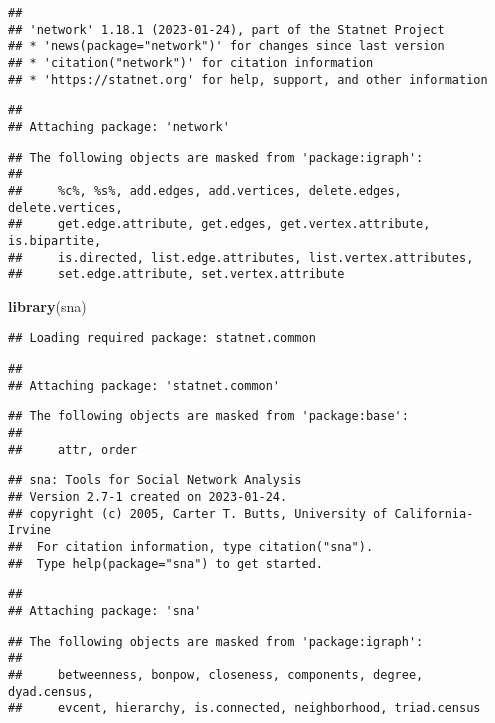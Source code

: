 \documentclass[
]{article}
\newenvironment{Shaded}{\begin{snugshade}}{\end{snugshade}}
\newcommand{\FunctionTok}[1]{\textcolor[rgb]{0.13,0.29,0.53}{\textbf{#1}}}
\newcommand{\NormalTok}[1]{#1}
\begin{document}
\begin{verbatim}
## 
## 'network' 1.18.1 (2023-01-24), part of the Statnet Project
## * 'news(package="network")' for changes since last version
## * 'citation("network")' for citation information
## * 'https://statnet.org' for help, support, and other information
\end{verbatim}

\begin{verbatim}
## 
## Attaching package: 'network'
\end{verbatim}

\begin{verbatim}
## The following objects are masked from 'package:igraph':
## 
##     %c%, %s%, add.edges, add.vertices, delete.edges, delete.vertices,
##     get.edge.attribute, get.edges, get.vertex.attribute, is.bipartite,
##     is.directed, list.edge.attributes, list.vertex.attributes,
##     set.edge.attribute, set.vertex.attribute
\end{verbatim}

\begin{Shaded}
\begin{Highlighting}[]
\FunctionTok{library}\NormalTok{(sna)}
\end{Highlighting}
\end{Shaded}

\begin{verbatim}
## Loading required package: statnet.common
\end{verbatim}

\begin{verbatim}
## 
## Attaching package: 'statnet.common'
\end{verbatim}

\begin{verbatim}
## The following objects are masked from 'package:base':
## 
##     attr, order
\end{verbatim}

\begin{verbatim}
## sna: Tools for Social Network Analysis
## Version 2.7-1 created on 2023-01-24.
## copyright (c) 2005, Carter T. Butts, University of California-Irvine
##  For citation information, type citation("sna").
##  Type help(package="sna") to get started.
\end{verbatim}

\begin{verbatim}
## 
## Attaching package: 'sna'
\end{verbatim}

\begin{verbatim}
## The following objects are masked from 'package:igraph':
## 
##     betweenness, bonpow, closeness, components, degree, dyad.census,
##     evcent, hierarchy, is.connected, neighborhood, triad.census
\end{verbatim}
\end{document}
